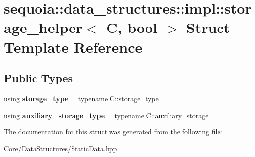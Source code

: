 \hypertarget{structsequoia_1_1data__structures_1_1impl_1_1storage__helper}{}\section{sequoia\+::data\+\_\+structures\+::impl\+::storage\+\_\+helper$<$ C, bool $>$ Struct Template Reference}
\label{structsequoia_1_1data__structures_1_1impl_1_1storage__helper}
\subsection*{Public Types}
\begin{DoxyCompactItemize}
\item 
\mbox{\label{structsequoia_1_1data__structures_1_1impl_1_1storage__helper_ad59be30bcd8274ade57d4c2ec806b57e}} 
using {\bfseries storage\+\_\+type} = typename C\+::storage\+\_\+type
\item 
\mbox{\label{structsequoia_1_1data__structures_1_1impl_1_1storage__helper_ad3462f1958308e75912bc0493ea56f9b}} 
using {\bfseries auxiliary\+\_\+storage\+\_\+type} = typename C\+::auxiliary\+\_\+storage
\end{DoxyCompactItemize}


The documentation for this struct was generated from the following file\+:\begin{DoxyCompactItemize}
\item 
Core/\+Data\+Structures/\mbox{\hyperlink{_static_data_8hpp}{Static\+Data.\+hpp}}\end{DoxyCompactItemize}
